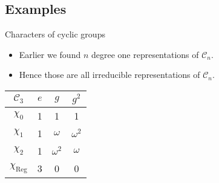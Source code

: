\documentclass[10pt]{beamer}
\newcommand{\Cyc}{\mathcal{C}}
\newcommand{\Reg}{\text{Reg}}
\begin{document}
	\subsection{Examples}
	\begin{frame}{Characters of cyclic groups}
		
		\begin{itemize}
			\item Earlier we found $n$ degree one representations of $\Cyc_n$.
			\item Hence those are all irreducible representations of $\Cyc_n$.
		\end{itemize}\pause
		\begin{example}[$\Cyc_3$]
			\begin{table}
				\centering
				\begin{tabular}{c | c c c}
					$\Cyc_3$ & $e$ & $g$        & $g^2$      \\ \hline
					$\chi_0$          & 1   & 1          & 1          \\
					$\chi_1$          & 1   & $\omega$   & $\omega^2$ \\
					$\chi_2$          & 1   & $\omega^2$ & $\omega$ \\ \hline\hline
					$\chi_\text{Reg}$ & 3 & 0 & 0
				\end{tabular}
			\end{table}
		\end{example}
		
	\end{frame}
	
\end{document}
